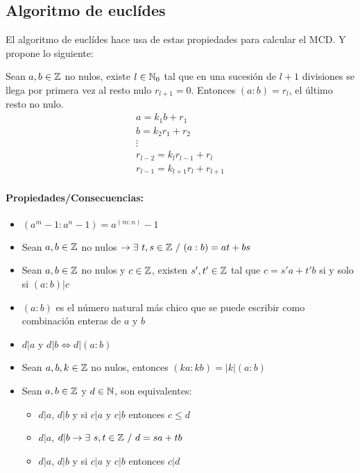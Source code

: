 \subsection{Algoritmo de euclídes}

El algoritmo de euclídes hace usa de estas propiedades para calcular el MCD. Y propone lo siguiente:

Sean $a,b\in\mathbb{Z}$ no nulos, existe $l\in\mathbb{N}_0$ tal que en una sucesión de $l+1$ divisiones se llega por primera vez al resto nulo $r_{l+1} = 0$. Entonces $(a:b) = r_l$, el último resto no nulo.
\begin{equation*}
\begin{array}{c}
    a =  k_1b + r_1\\
    b =  k_2r_1 + r_2 \\
    \vdots \\
    r_{l-2} = k_lr_{l-1} + r_{l} \\
    r_{l-1} = k_{l+1}r_{l} + r_{l+1}
\end{array}
\end{equation*}


\paragraph{Propiedades/Consecuencias:}

\begin{itemize}
    \item $(a^m -1 : a^n-1) = a^{(m:n)}-1$
    \item Sean $a,b\in\mathbb{Z}$ no nulos $\to\exists~t,s\in\mathbb{Z}~/~(a:b) = at + bs$
    \item Sean $a,b\in\mathbb{Z}$ no nulos y $c\in\mathbb{Z}$, existen $s', t'\in\mathbb{Z}$ tal que $c = s'a + t'b$ si y solo si $(a:b)|c$
    \item $(a:b)$ es el número natural más chico que se puede escribir como combinación enteras de $a$ y $b$
    \item $d|a$ y $d|b\iff d|(a:b)$
    \item Sean $a,b,k\in\mathbb{Z}$ no nulos, entonces $(ka : kb) = |k|(a:b)$
    \item Sean $a,b\in\mathbb{Z}$ y $d\in\mathbb{N}$, son equivalentes:
    \begin{itemize}
        \item $d|a$, $d|b$ y si $c|a$ y $c|b$ entonces $c\leq d$
        \item $d|a$, $d|b\to\exists~s,t\in\mathbb{Z}~/~d=sa+tb$
        \item $d|a$, $d|b$ y si $c|a$ y $c|b$ entonces $c|d$
    \end{itemize}
\end{itemize}

